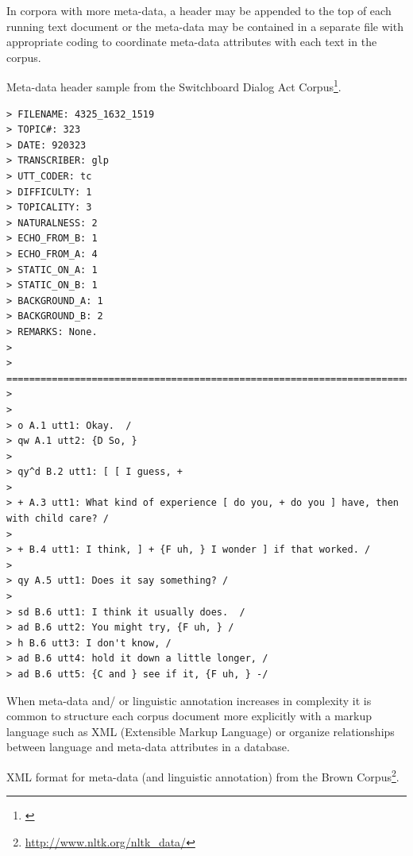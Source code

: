 \documentclass[
  letterpaper,
]{latex/krantz}
\DeclareRobustCommand{\href}[2]{#2\footnote{\url{#1}}}
\begin{document}
In corpora with more meta-data, a header may be appended to the top of
each running text document or the meta-data may be contained in a
separate file with appropriate coding to coordinate meta-data attributes
with each text in the corpus.

Meta-data header sample from the \href{}{Switchboard Dialog Act Corpus}.

\begin{verbatim}
> FILENAME: 4325_1632_1519
> TOPIC#: 323
> DATE: 920323
> TRANSCRIBER: glp
> UTT_CODER: tc
> DIFFICULTY: 1
> TOPICALITY: 3
> NATURALNESS: 2
> ECHO_FROM_B: 1
> ECHO_FROM_A: 4
> STATIC_ON_A: 1
> STATIC_ON_B: 1
> BACKGROUND_A: 1
> BACKGROUND_B: 2
> REMARKS: None.
>
>
=========================================================================
>
>
> o A.1 utt1: Okay.  /
> qw A.1 utt2: {D So, }
>
> qy^d B.2 utt1: [ [ I guess, +
>
> + A.3 utt1: What kind of experience [ do you, + do you ] have, then
with child care? /
>
> + B.4 utt1: I think, ] + {F uh, } I wonder ] if that worked. /
>
> qy A.5 utt1: Does it say something? /
>
> sd B.6 utt1: I think it usually does.  /
> ad B.6 utt2: You might try, {F uh, } /
> h B.6 utt3: I don't know, /
> ad B.6 utt4: hold it down a little longer, /
> ad B.6 utt5: {C and } see if it, {F uh, } -/
\end{verbatim}

When meta-data and/ or linguistic annotation increases in complexity it
is common to structure each corpus document more explicitly with a
markup language such as XML (Extensible Markup Language) or organize
relationships between language and meta-data attributes in a database.

XML format for meta-data (and linguistic annotation) from the
\href{http://www.nltk.org/nltk_data/}{Brown Corpus}.
\end{document}
